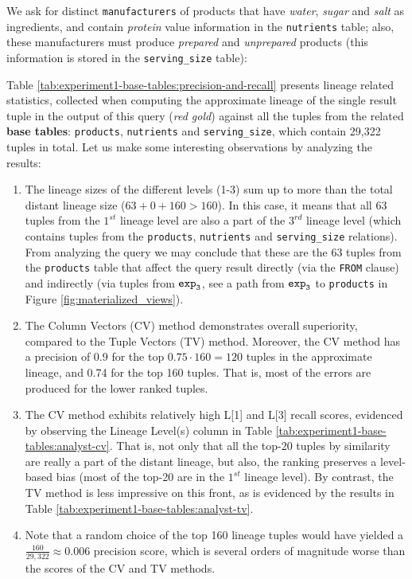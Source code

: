 \begin{experiment-withrun}\label{advanced-experiment:1}
We ask for distinct \texttt{manufacturers} of products that have \textit{water}, \textit{sugar} and \textit{salt} as  ingredients, and contain \textit{protein} value information in the \texttt{nutrients} table; also, these manufacturers must produce \textit{prepared} and \textit{unprepared} products (this information is stored in the \texttt{serving\_size} table):\footnotemark


Table \ref{tab:experiment1-base-tables:precision-and-recall} presents lineage related statistics, collected when computing the approximate lineage of the single result tuple in the output of this query (\textit{red gold}) against all the tuples from the related \textbf{base tables}: \texttt{products}, \texttt{nutrients} and \texttt{serving\_size}, which contain 29,322 tuples in total. Let us make some interesting observations by analyzing the results:
\begin{enumerate}
    \item The lineage sizes of the different levels (1-3) sum up to more than the total distant lineage size ($63 + 0 + 160 > 160$). In this case, it means that all 63 tuples from the $1^{st}$ lineage level are also a part of the $3^{rd}$ lineage level (which contains tuples from the \texttt{products}, \texttt{nutrients} and \texttt{serving\_size} relations). From analyzing the query we may conclude that these are the 63 tuples from the \texttt{products} table that affect the query result directly (via the \texttt{FROM} clause) and indirectly (via tuples from $\texttt{exp}\sb\texttt{3}$, see a path from $\texttt{exp}\sb\texttt{3}$ to \texttt{products} in Figure \ref{fig:materialized_views}).
    \item The Column Vectors (CV) method demonstrates overall superiority, compared to the Tuple Vectors (TV) method. Moreover, the  CV method has a precision of 0.9 for the top $0.75\cdot160 = 120$ tuples in the approximate lineage, and 0.74 for the top 160 tuples. That is, most of the errors are produced for the lower ranked tuples.
    \item The CV method exhibits relatively high L[1] and L[3] recall scores, evidenced by observing the Lineage Level(s) column in Table \ref{tab:experiment1-base-tables:analyst-cv}. That is, not only that all the top-20 tuples by similarity are really a part of the distant lineage, but also, the ranking preserves a level-based bias (most of the top-20 are in the $1^{st}$ lineage level). By contrast, the TV method is less impressive on this front, as is evidenced by the results in Table \ref{tab:experiment1-base-tables:analyst-tv}.
    \item Note that a random choice of the top 160 lineage tuples would have yielded a $\frac{160}{29,322} \approx 0.006$ precision score, which is several orders of magnitude worse than the scores of the CV and TV methods. 
\end{enumerate}


\end{experiment-withrun}
